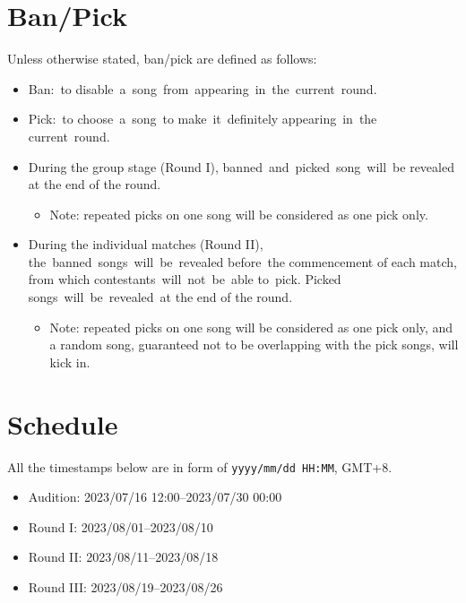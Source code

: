\documentclass{article}
\newcommand{\alert}[1]{{\color{red} #1}}
\begin{document}
\section{Ban/Pick}

Unless otherwise stated, ban/pick are defined as follows:

\begin{itemize}
	\item Ban: to disable a song from appearing in the current round.

	\item Pick: to choose a song to make it definitely
	      appearing in the current round.

	\item During the group stage (Round I),
	      banned and picked song will be revealed
	      at the end of the round.
	      \begin{itemize}
		      \item \alert{
			            Note: repeated picks on one
			            song will be considered as one pick only.
		            }
	      \end{itemize}

	\item During the individual matches (Round II),
	      the banned songs will be revealed before the commencement of each match,
	      from which contestants will not be able to pick.
	      Picked songs will be revealed at the end of the round.
	      \begin{itemize}
		      \item \alert{
			            Note: repeated picks on one
			            song will be considered as one pick only,
			            and a random song,
			            guaranteed not to be
			            overlapping with the pick songs,
			            will kick in.  %
		            }
	      \end{itemize}
\end{itemize}

\section{Schedule}

All the timestamps below are in form of
\texttt{yyyy/mm/dd HH:MM}, GMT+8.

\begin{itemize}
	\item   Audition: 2023/07/16 12:00--2023/07/30 00:00
	\item   Round I: 2023/08/01--2023/08/10
	\item   Round II: 2023/08/11--2023/08/18
	\item   Round III: 2023/08/19--2023/08/26
\end{itemize}
\end{document}
